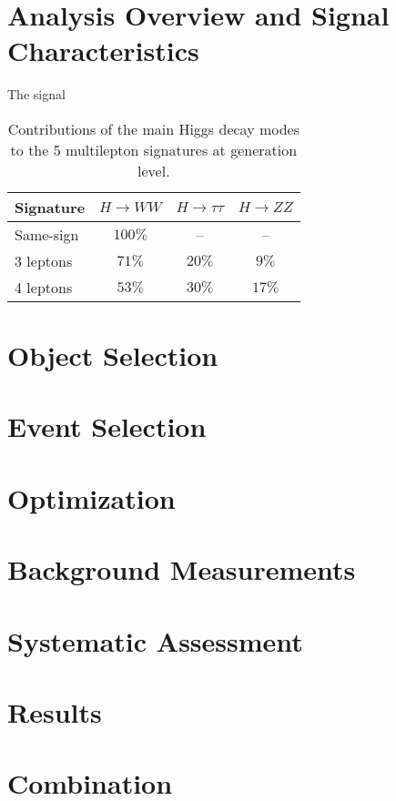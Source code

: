 \subsection{}


\section{Analysis Overview and Signal Characteristics} 

The signal 

\begin{table}[htbp]
  \begin{center} 
    \caption{Contributions of the main Higgs decay modes to the 5 multilepton
      \tth signatures at generation level.
      }\label{tab:summary} {\small
    \begin{tabular}{l|c|c|c} 
      \hline\hline
  Signature & $H \rightarrow WW$  & $H\rightarrow \tau\tau$  & $H \rightarrow
  ZZ$  \\\hline
  Same-sign &  $100\%$ & -- & -- \\
  3 leptons  &  $71\%$ & $20\%$ & $9\%$ \\
  4 leptons  &  $53\%$ & $30\%$ & $17\%$  \\
     \hline
    \end{tabular}}
  \end{center}
\end{table}






\section{Object Selection}
\section{Event Selection}
\section{Optimization}
\section{Background Measurements}
\section{Systematic Assessment}
\section{Results}
\section{Combination}

